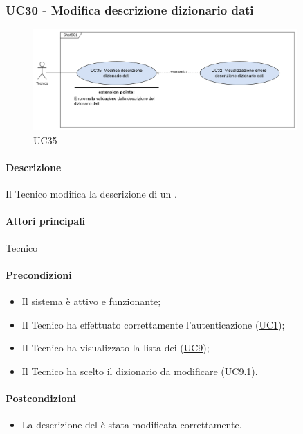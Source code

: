 \subsubsection{UC30 - Modifica descrizione dizionario dati}\label{UC30}

\begin{figure}[H]
  \centering
  \includegraphics[width=0.90\textwidth]{assets/uc35.png}
  \caption{UC35}
\end{figure}

\paragraph*{Descrizione}
Il Tecnico modifica la descrizione di un .

\paragraph*{Attori principali}
Tecnico

\paragraph*{Precondizioni}
\begin{itemize}
  \item Il sistema è attivo e funzionante;
  \item Il Tecnico ha effettuato correttamente l'autenticazione (\hyperref[UC1]{UC1});
  \item Il Tecnico ha visualizzato la lista dei  (\hyperref[UC9]{UC9});
  \item Il Tecnico ha scelto il dizionario da modificare (\hyperref[UC9.1]{UC9.1}).
\end{itemize}

\paragraph*{Postcondizioni}
\begin{itemize}
  \item La descrizione del  è stata modificata correttamente.
\end{itemize}

